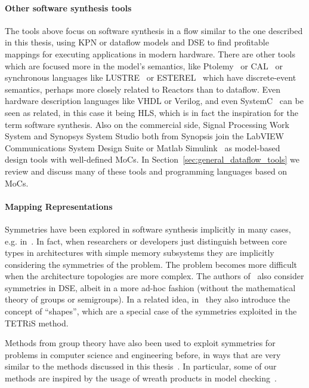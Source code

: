 \paragraph{Other software synthesis tools}
The tools above focus on software synthesis in a flow similar to the one described in this thesis, using \ac{KPN} or dataflow models and \ac{DSE} to find profitable mappings for executing applications in modern hardware.
There are other tools which are focused more in the model's semantics, like Ptolemy~\cite{Ptolemaeus:14:SystemDesign} or CAL~\cite{eker2003cal} or synchronous languages like LUSTRE~\cite{lustre} or ESTEREL~\cite{esterel} which have discrete-event semantics, perhaps more closely related to Reactors than to dataflow.
Even hardware description languages like VHDL or Verilog, and even SystemC~\cite{semantics_systemc} can be seen as related, in this case it being \ac{HLS}, which is in fact the inspiration for the term software synthesis.
Also on the commercial side, Signal Processing Work System and Synopsys System Studio both from Synopsis join the LabVIEW Communications System Design Suite or Matlab Simulink~\cite{klikpo2016modeling} as model-based design tools with well-defined \acp{MoC}.
In Section~\ref{sec:general_dataflow_tools} we review and discuss many of these tools and programming languages based on \acp{MoC}.

\paragraph{Mapping Representations}
Symmetries have been explored in software synthesis implicitly in many cases, e.g. in~\cite{singh2010communication,thompson2013exploiting}. 
In fact, when researchers or developers just distinguish between core types in architectures with simple memory subsystems they are implicitly considering the symmetries of the problem.
The problem becomes more difficult when the architecture topologies are more complex.
The authors of~\cite{schwarzer2017symmetry} also consider symmetries in \ac{DSE}, albeit in a more ad-hoc fashion (without the mathematical theory of groups or semigroups).
In a related idea, in~\cite{shapes} they also introduce the concept of ``shapes'', which are a special case of the symmetries exploited in the \ac{TETRiS} method.

Methods from group theory have also been used to exploit symmetries for problems in computer science and engineering before, in ways that are very similar to the methods discussed in this thesis~\cite{crawford1996symmetry,clarke1998symmetry}.
In particular, some of our methods are inspired by the usage of wreath products in model checking~\cite{donaldson2009constructive}.

